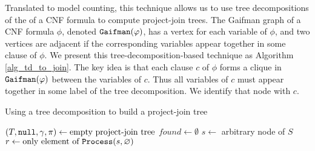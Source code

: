 Translated to model counting, this technique allows us to use tree decompositions of the  of a CNF formula to compute project-join trees.
The Gaifman graph of a CNF formula $\phi$, denoted $\texttt{\upshape Gaifman}(\varphi)$, has a vertex for each variable of $\phi$, and two vertices are adjacent if the corresponding variables appear together in some clause of $\phi$.
We present this tree-decomposition-based technique as Algorithm \ref{alg_td_to_join}.
The key idea is that each clause $c$ of $\phi$ forms a clique in $\texttt{\upshape Gaifman}(\varphi)$ between the variables of $c$.
Thus all variables of $c$ must appear together in some label of the tree decomposition.
We identify that node with $c$.
\begin{algorithm*}[t]
\label{alg_td_to_join}
\caption{Using a tree decomposition to build a project-join tree}
    \DontPrintSemicolon
    $(T, \texttt{\upshape null}, \gamma, \pi) \gets \text{empty project-join tree}$\;
    $found \gets \emptyset$
    $s \gets$ arbitrary node of $S$ \label{line_arbitrary_node}
    $r \gets \text{only element of}~\texttt{\upshape Process}(s, \varnothing)$\;
\end{algorithm*}

